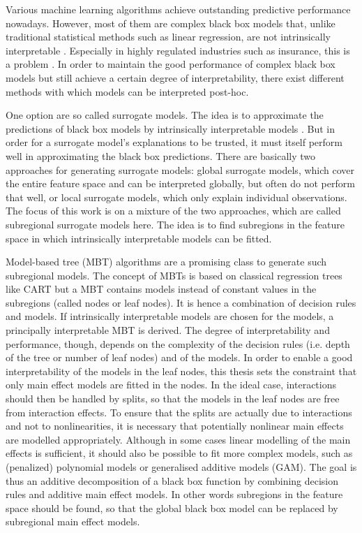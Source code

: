 Various machine learning algorithms achieve outstanding predictive performance nowadays. However, most of them are complex black box models that, unlike traditional statistical methods such as linear regression, are not intrinsically interpretable \citep{Hu.2020}.
Especially in highly regulated industries such as insurance, this is a problem \citep{Henckaerts.2022}.
In order to maintain the good performance of complex black box models but still achieve a certain degree of interpretability, there exist different methods with which models can be interpreted post-hoc. 


One option are so called surrogate models. The idea is to approximate the predictions of black box models by intrinsically interpretable models \citep{Molnar.2019}.
But in order for a surrogate model's explanations to be trusted, it must itself perform well in approximating the black box predictions.
There are basically two approaches for generating surrogate models: global surrogate models, which cover the entire feature space and can be interpreted globally, but often do not perform that well, or local surrogate models, which only explain individual observations.  The focus of this work is on a mixture of the two approaches, which are called subregional surrogate models here. 
The idea is to find subregions in the feature space in which intrinsically interpretable models can be fitted.


Model-based tree (MBT) algorithms are a promising class to generate such subregional models. 
The concept of MBTs is based on classical regression trees like CART \citep{Breiman.1984} but a MBT contains models instead of constant values in the subregions (called nodes or leaf nodes).
It is hence a combination of decision rules and models. If intrinsically interpretable models are chosen for the models, a principally interpretable MBT is derived. The degree of interpretability and performance, though, depends on the complexity of the decision rules (i.e. depth of the tree or number of leaf nodes) and of the models.
In order to enable a good interpretability of the models in the leaf nodes, this thesis sets the constraint that only main effect models are fitted in the nodes. 
In the ideal case, interactions should then be handled by  splits, so that the models in the leaf nodes are free from interaction effects.
To ensure that the splits are actually due to interactions and not to nonlinearities, it is necessary that potentially nonlinear main effects are modelled appropriately.
Although in some cases linear modelling of the main effects is sufficient, it should also be possible to fit more complex models, such as (penalized) polynomial models or generalised additive models (GAM).
The goal is thus an additive decomposition of a black box function by combining decision rules and additive main effect models.  In other words
subregions in the feature space should be found, so that the global black box model can be replaced by subregional main effect models.


